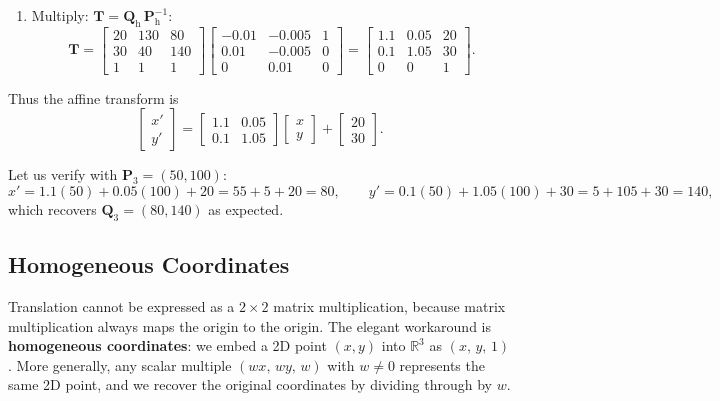 \begin{enumerate}
    \item Multiply: $\mathbf{T} = \mathbf{Q}_{\mathrm{h}}\, \mathbf{P}_{\mathrm{h}}^{-1}$:
    \[
        \mathbf{T} =
        \begin{bmatrix}
            20 & 130 & 80 \\
            30 &  40 &140 \\
            1  &   1 &  1
        \end{bmatrix}
        \begin{bmatrix}
            -0.01 & -0.005 & 1 \\
             0.01 & -0.005 & 0 \\
             0    &  0.01  & 0
        \end{bmatrix}
        =
        \begin{bmatrix}
            1.1  &  0.05  & 20 \\
            0.1  &  1.05  & 30 \\
            0    &  0     &  1
        \end{bmatrix}.
    \]
\end{enumerate}

Thus the affine transform is
\[
\begin{bmatrix} x' \\ y' \end{bmatrix}
=
\begin{bmatrix}
    1.1  &  0.05 \\
    0.1  &  1.05
\end{bmatrix}
\begin{bmatrix} x \\ y \end{bmatrix}
+
\begin{bmatrix} 20 \\ 30 \end{bmatrix}.
\]

Let us verify with $\mathbf{P}_3 = (50, 100)$:
\[
    x' = 1.1(50) + 0.05(100) + 20 = 55 + 5 + 20 = 80, \qquad
    y' = 0.1(50) + 1.05(100) + 30 = 5 + 105 + 30 = 140,
\]
which recovers $\mathbf{Q}_3 = (80, 140)$ as expected.

\subsection{Homogeneous Coordinates}\label{sec:homogeneous}

Translation cannot be expressed as a $2\times2$ matrix multiplication, because matrix multiplication always maps the origin to the origin.  The elegant workaround is \textbf{homogeneous coordinates}: we embed a 2D point $(x, y)$ into $\mathbb{R}^3$ as $(x,\,y,\,1)$.  More generally, any scalar multiple $(wx,\,wy,\,w)$ with $w \neq 0$ represents the same 2D point, and we recover the original coordinates by dividing through by $w$.

